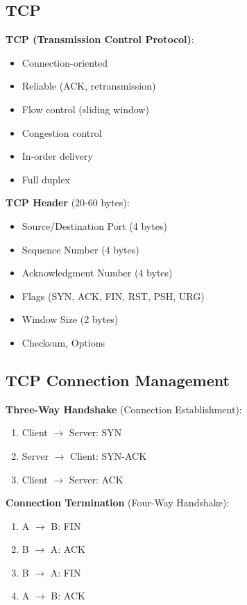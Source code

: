 \documentclass[12pt,a4paper]{report}
\begin{document}
\subsection{TCP}
\begin{concept}
\textbf{TCP (Transmission Control Protocol)}:
\begin{itemize}
    \item Connection-oriented
    \item Reliable (ACK, retransmission)
    \item Flow control (sliding window)
    \item Congestion control
    \item In-order delivery
    \item Full duplex
\end{itemize}

\textbf{TCP Header} (20-60 bytes):
\begin{itemize}
    \item Source/Destination Port (4 bytes)
    \item Sequence Number (4 bytes)
    \item Acknowledgment Number (4 bytes)
    \item Flags (SYN, ACK, FIN, RST, PSH, URG)
    \item Window Size (2 bytes)
    \item Checksum, Options
\end{itemize}
\end{concept}

\subsection{TCP Connection Management}
\begin{concept}
\textbf{Three-Way Handshake} (Connection Establishment):
\begin{enumerate}
    \item Client $\to$ Server: SYN
    \item Server $\to$ Client: SYN-ACK
    \item Client $\to$ Server: ACK
\end{enumerate}

\textbf{Connection Termination} (Four-Way Handshake):
\begin{enumerate}
    \item A $\to$ B: FIN
    \item B $\to$ A: ACK
    \item B $\to$ A: FIN
    \item A $\to$ B: ACK
\end{enumerate}
\end{concept}
\end{document}
